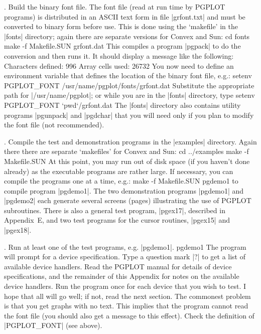 \bigskip{}. Build the binary font file.  The font file (read at run time by 
PGPLOT programs) is distributed in an ASCII text form in file 
|grfont.txt| and must be converted to binary form before use. This is
done using the `makefile' in the |fonts| directory; again there are
separate versions for Convex and Sun: 
\begintt
cd fonts
make -f Makefile.SUN grfont.dat
\endtt
This compiles a program |pgpack| to do the conversion and then runs it.
It should display a message like the following:
\begintt
Characters defined:   996
Array cells used:   26732
\endtt
You now need to define an environment variable that defines the location 
of the binary font file, e.g.:
\begintt
setenv PGPLOT_FONT /usr/name/pgplot/fonts/grfont.dat
\endtt
Substitute the appropriate path for |/usr/name/pgplot|; or while you are 
in the |fonts| directory, type
\begintt
setenv  PGPLOT_FONT `pwd`/grfont.dat
\endtt
The |fonts| directory also contains utility programs |pgunpack| and
|pgdchar| that you will need only if you plan to modify the font file (not
recommended). 

\bigskip{}. Compile the test and demonstration programs in the |examples| 
directory. Again there there are separate `makefiles' for Convex 
and Sun:
\begintt
cd ../examples
make -f Makefile.SUN
\endtt
At this point, you may run out of disk space (if you haven't done 
already) as the executable programs are rather large. If necessary, you
can compile the programs one at a time, e.g.:
\begintt
make -f Makefile.SUN pgdemo1
\endtt
to compile program |pgdemo1|. The two demonstration programs
|pgdemo1| and |pgdemo2| each generate several screens (pages) 
illustrating the use of PGPLOT subroutines. There is also a general test 
program, |pgex17|, described in Appendix~E, and two test programs for 
the cursor routines, |pgex15| and |pgex18|.

\bigskip{}. Run at least one of the test programs, e.g. |pgdemo1|.
\begintt
pgdemo1
\endtt
The program will prompt for a device specification. Type a question mark 
|?| to get a list of available device handlers. Read the PGPLOT manual
for details of device specifications, and the remainder of this 
Appendix for notes on the available device handlers. Run the program 
once for each device that you wish to test. I hope that all will go 
well; if not, read the next section. The commonest problem is that
you get graphs with no text. This implies that the program cannot read 
the font file (you should also get a message to this effect). Check the
definition of |PGPLOT_FONT| (see above).

